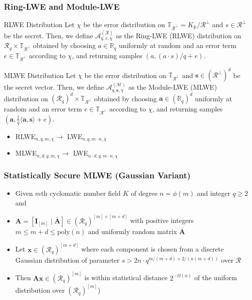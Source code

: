 \documentclass[t, aspectratio=169]{beamer}
\begin{document}
\begin{frame}
    \frametitle{Ring-LWE and Module-LWE}
    \begin{block}{RLWE Distribution}
        Let $\chi$ be the error distribution on $\mathbb{T}_{\mathcal{R}^\perp} = K_\mathbb{R} / \mathcal{R}^\perp$ and $s \in \mathcal{R}^\perp$ be the secret. Then, we define $\mathcal{A}_{q, s, \chi}^{(\mathcal{R})}$ as the Ring-LWE (RLWE) distribution on $\mathcal{R}_q \times \mathbb{T}_{\mathcal{R}^\perp}$ obtained by choosing $a \in \mathbb{R}_q$ uniformly at random and an error term $e \in \mathbb{T}_{\mathcal{R}^\perp}$ according to $\chi$, and returning samples $(a, (a \cdot s)/q + e)$.
    \end{block}\pause
    \begin{block}{MLWE Distribution}
        Let $\chi$ be the error distribution on $\mathbb{T}_{\mathcal{R}^\perp}$ and $\mathbf{s} \in (\mathcal{R}^\perp)^d$ be the secret vector. Then, we define $\mathcal{A}_{q, \mathbf{s}, \chi}^{(\mathcal{M})}$ as the Module-LWE (MLWE) distribution on $(\mathcal{R}_q)^d \times \mathbb{T}_{\mathcal{R}^\perp}$ obtained by choosing $\mathbf{a} \in (\mathbb{R}_q)^d$ uniformly at random and an error term $e \in \mathbb{T}_{\mathcal{R}^\perp}$ according to $\chi$, and returning samples $(\mathbf{a}, \frac{1}{q}\langle \mathbf{a},\mathbf{s}\rangle + e)$.
    \end{block}
    \begin{itemize}[<+->]
        \item RLWE$_{n, q, m, \chi} \longrightarrow$ LWE$_{n, q, m \cdot n, \chi}$
        \item MLWE$_{n, d, q, m, \chi} \longrightarrow$ LWE$_{n \cdot d, q, m \cdot n, \chi}$
    \end{itemize}
\end{frame}

\begin{frame}
    \frametitle{Statistically Secure MLWE (Gaussian Variant)}
    \begin{itemize}[<+->]
        \item Given $m$th cyclomatic number field $K$ of degree $n=\phi(m)$ and integer $q\geq 2$ and
        \item $\mathbf{A} = [ \mathbf{I}_{[m]} \mid \bar{\mathbf{A}}] \in (\mathcal{R}_q)^{[m] \times [m+d]}$ with positive integers $m \leq m + d \leq \text{poly}(n)$ and uniformly random matrix $\bar{\mathbf{A}}$ %
        \item Let $\mathbf{x} \in (\mathcal{R}_q)^{[m+d]}$ where each component is chosen from a discrete Gaussian distribution of parameter $s > 2n \cdot q^{m / (m+d) + 2/(n (m+d))}$ over $\mathcal{R}$
        \item Then $\mathbf{A}\mathbf{x} \in (\mathcal{R}_q)^{[m]}$ is within statistical distance $2^{-\Omega(n)}$ of the uniform distribution over $(\mathcal{R}_q)^{[m]}$)
    \end{itemize}
\end{frame}
\end{document}
